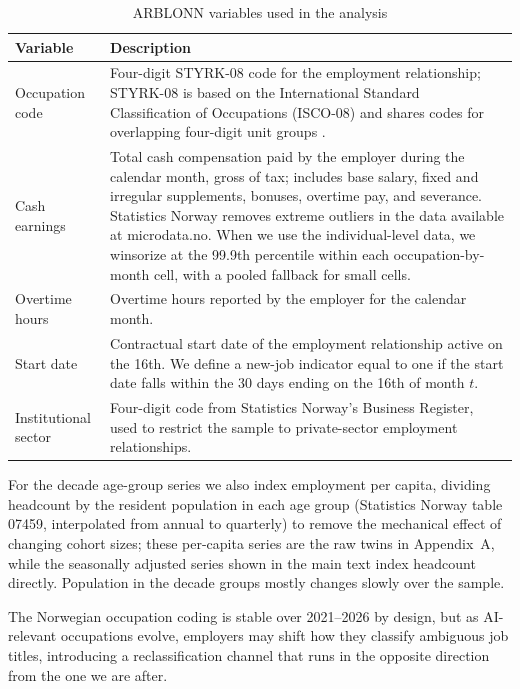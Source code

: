 \documentclass[12pt]{article}
\begin{document}
\begin{table}[htbp]
\centering
\caption{ARBLONN variables used in the analysis}
\label{tab:arblonn_variables}
\footnotesize
\begin{tabular}{p{4.2cm}p{10cm}}
\toprule
Variable & Description \\
\midrule
Occupation code & Four-digit STYRK-08 code for the employment relationship; STYRK-08 is based on the International Standard Classification of Occupations (ISCO-08) and shares codes for overlapping four-digit unit groups \citep{ssb2011styrk}. \\[4pt]
Cash earnings & Total cash compensation paid by the employer during the calendar month, gross of tax; includes base salary, fixed and irregular supplements, bonuses, overtime pay, and severance. Statistics Norway removes extreme outliers in the data available at microdata.no. When we use the individual-level data, we winsorize at the 99.9th percentile within each occupation-by-month cell, with a pooled fallback for small cells. \\[4pt]
Overtime hours & Overtime hours reported by the employer for the calendar month. \\[4pt]
Start date & Contractual start date of the employment relationship active on the 16th. We define a new-job indicator equal to one if the start date falls within the 30 days ending on the 16th of month $t$. \\[4pt]
Institutional sector & Four-digit code from Statistics Norway's Business Register, used to restrict the sample to private-sector employment relationships. \\
\bottomrule
\end{tabular}
\end{table}

For the decade age-group series we also index employment per capita, dividing headcount by the resident population in each age group (Statistics Norway table 07459, interpolated from annual to quarterly) to remove the mechanical effect of changing cohort sizes; these per-capita series are the raw twins in Appendix~A, while the seasonally adjusted series shown in the main text index headcount directly. Population in the decade groups mostly changes slowly over the sample.

The Norwegian occupation coding is stable over 2021--2026 by design, but as AI-relevant occupations evolve, employers may shift how they classify ambiguous job titles, introducing a reclassification channel that runs in the opposite direction from the one we are after.
\end{document}
